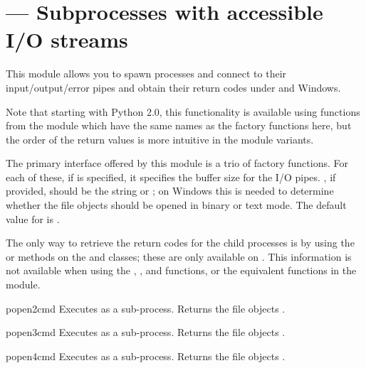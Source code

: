 \section{ ---
         Subprocesses with accessible I/O streams}



This module allows you to spawn processes and connect to their
input/output/error pipes and obtain their return codes under
\UNIX{} and Windows.

Note that starting with Python 2.0, this functionality is available
using functions from the  module which have the same
names as the factory functions here, but the order of the return
values is more intuitive in the  module variants.

The primary interface offered by this module is a trio of factory
functions.  For each of these, if  is specified, 
it specifies the buffer size for the I/O pipes.  , if
provided, should be the string  or ; on Windows
this is needed to determine whether the file objects should be opened
in binary or text mode.  The default value for  is
.

The only way to retrieve the return codes for the child processes is
by using the  or  methods on the
 and  classes; these are only available on
\UNIX.  This information is not available when using the
, , and 
functions, or the equivalent functions in the  module.

\begin{funcdesc}{popen2}{cmd}
Executes  as a sub-process.  Returns the file objects
.
\end{funcdesc}

\begin{funcdesc}{popen3}{cmd}
Executes  as a sub-process.  Returns the file objects
.
\end{funcdesc}

\begin{funcdesc}{popen4}{cmd}
Executes  as a sub-process.  Returns the file objects
.
\end{funcdesc}


